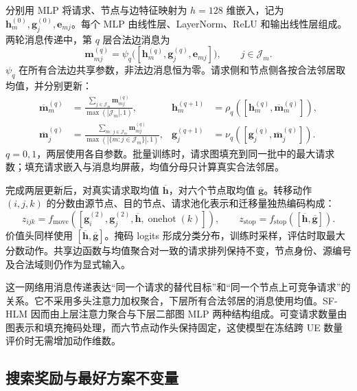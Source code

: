 分别用 MLP 将请求、节点与边特征映射为 $h=128$ 维嵌入，记为 $\mathbf h_m^{(0)},\mathbf g_j^{(0)},\mathbf e_{mj}$。每个 MLP 由线性层、LayerNorm、ReLU 和输出线性层组成。两轮消息传递中，第 $q$ 层合法边消息为
\begin{equation}
 \mathbf m_{mj}^{(q)}=\psi_q\bigl([
 \mathbf h_m^{(q)},\mathbf g_j^{(q)},\mathbf e_{mj}]\bigr),
 \qquad j\in\mathcal J_m.
 \label{legacy:eq:ch5-message}
\end{equation}
$\psi_q$ 在所有合法边共享参数，非法边消息恒为零。请求侧和节点侧各按合法邻居取均值，并分别更新：
\begin{equation}
 \begin{aligned}
 \overline{\mathbf m}_m^{(q)}&=
 \frac{\sum_{j\in\mathcal J_m}\mathbf m_{mj}^{(q)}}{\max(|\mathcal J_m|,1)},
 &\mathbf h_m^{(q+1)}&=\rho_q([\mathbf h_m^{(q)},\overline{\mathbf m}_m^{(q)}]),\\
 \overline{\mathbf m}_j^{(q)}&=
 \frac{\sum_{m:\,j\in\mathcal J_m}\mathbf m_{mj}^{(q)}}{\max(|\{m:j\in\mathcal J_m\}|,1)},
 &\mathbf g_j^{(q+1)}&=\nu_q([\mathbf g_j^{(q)},\overline{\mathbf m}_j^{(q)}]).
 \end{aligned}
 \label{legacy:eq:ch5-message-update}
\end{equation}
$q=0,1$，两层使用各自参数。批量训练时，请求图填充到同一批中的最大请求数；填充请求嵌入与消息均屏蔽，均值分母只计算真实合法邻居。

完成两层更新后，对真实请求取均值 $\overline{\mathbf h}$，对六个节点取均值 $\overline{\mathbf g}$。转移动作 $(i,j,k)$ 的分数由源节点、目的节点、请求池化表示和迁移量独热编码构成：
\begin{equation}
 z_{ijk}=f_{\mathrm{move}}([\mathbf g_i^{(2)},\mathbf g_j^{(2)},
                  \overline{\mathbf h},\operatorname{onehot}(k)]),\qquad
 z_{\mathrm{stop}}=f_{\mathrm{stop}}([\overline{\mathbf h},\overline{\mathbf g}]).
 \label{legacy:eq:ch5-action-heads}
\end{equation}
价值头同样使用 $[\overline{\mathbf h},\overline{\mathbf g}]$。掩码 logits 形成分类分布，训练时采样，评估时取最大分数动作。共享边函数与均值聚合对一致的请求排列保持不变，节点身份、源编号及合法域则仍作为显式输入。

这一网络用消息传递表达“同一个请求的替代目标”和“同一个节点上可竞争请求”的关系。它不采用多头注意力加权聚合，下层所有合法邻居的消息使用均值。SF-HLM 因而由上层注意力聚合与下层二部图 MLP 两种结构组成。可变请求数量由图表示和填充掩码处理，而六节点动作头保持固定，这使模型在冻结跨 UE 数量评价时无需增加动作维数。

\subsection{搜索奖励与最好方案不变量}

